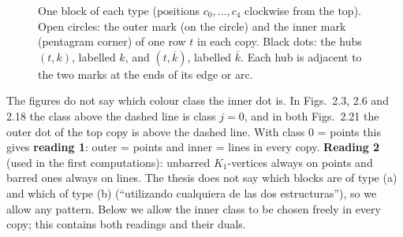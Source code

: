 \documentclass[11pt]{amsart}
\theoremstyle{plain}
\theoremstyle{definition}
\theoremstyle{remark}
\newcommand{\bk}[1]{\overline{#1}}
\begin{document}
\begin{figure}[ht]
\centering
{}
\caption{One block of each type (positions $c_0, \dots, c_4$ clockwise from the top). Open circles: the outer mark (on
the circle) and the inner mark (pentagram corner) of one row $t$ in each copy. Black dots: the hubs $(t,k)$, labelled
$k$, and $(t,\bk k)$, labelled $\bar k$. Each hub is adjacent to the two marks at the ends of its edge or arc.}
\label{fig:blocks}
\end{figure}

The figures do not say which colour class the inner dot is. In Figs.~2.3, 2.6 and 2.18 the class above the dashed line
is class $j = 0$, and in both Figs.~2.21 the outer dot of the top copy is above the dashed line. With class $0$ = points
this gives \textbf{reading 1}: outer = points and inner = lines in every copy. \textbf{Reading 2} (used in the first
computations): unbarred $K_1$-vertices always on points and barred ones always on lines. The thesis does not say which
blocks are of type (a) and which of type (b) (``utilizando cualquiera de las dos estructuras''), so we allow any pattern.
Below we allow the inner class to be chosen freely in every copy; this contains both readings and their duals.
\end{document}
